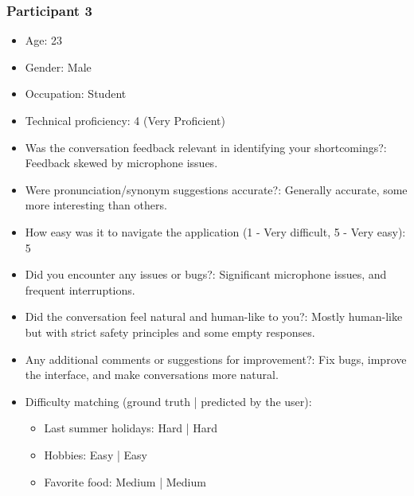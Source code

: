 \documentclass{article}
\begin{document}
\subsubsection{Participant 3}
\begin{itemize}
    \item Age: 23
    \item Gender: Male
    \item Occupation: Student
    \item Technical proficiency: 4 (Very Proficient)
    \item Was the conversation feedback relevant in identifying your shortcomings?: Feedback skewed by microphone issues.
    \item Were pronunciation/synonym suggestions accurate?: Generally accurate, some more interesting than others.
    \item How easy was it to navigate the application (1 - Very difficult, 5 - Very easy): 5
    \item Did you encounter any issues or bugs?: Significant microphone issues, and frequent interruptions.
    \item Did the conversation feel natural and human-like to you?: Mostly human-like but with strict safety principles and some empty responses.
    \item Any additional comments or suggestions for improvement?: Fix bugs, improve the interface, and make conversations more natural.
    \item Difficulty matching (ground truth | predicted by the user):
    \begin{itemize}
        \item Last summer holidays: Hard | Hard
        \item Hobbies: Easy | Easy
        \item Favorite food: Medium | Medium
    \end{itemize}
\end{itemize}
\end{document}
